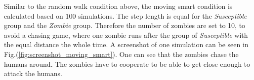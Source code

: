 \documentclass[%
twoside,                 %
final,                   %
chapterprefix=true,      %
open=right               %
10pt]{book}
\begin{document}
\vspace{3mm}




\vspace{3mm}


Similar to the random walk condition above, the moving smart condition is calculated based on 100 simulations. The step length is equal for the \emph{Susceptible} group and the \emph{Zombie} group. Therefore the number of zombies are set to 10, to avoid a chasing game, where one zombie runs after the group of \emph{Susceptible} with the equal distance the whole time. A screenshot of one simulation can be seen in Fig.(\ref{fig:screenshot_moving_smart}). One can see that the zombies chase the humans around. The zombies have to cooperate to be able to get close enough to attack the humans.  


\vspace{3mm}




\vspace{3mm}
\end{document}
